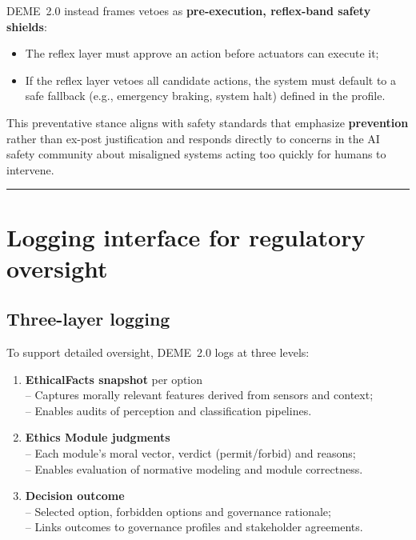 \documentclass[11pt]{article}
\begin{document}
DEME~2.0 instead frames vetoes as \textbf{pre-execution, reflex-band safety shields}:

\begin{itemize}
  \item The reflex layer must approve an action before actuators can execute it;
  \item If the reflex layer vetoes all candidate actions, the system must default to a safe fallback (e.g., emergency braking, system halt) defined in the profile.
\end{itemize}

This preventative stance aligns with safety standards that emphasize \textbf{prevention} rather than ex-post justification and responds directly to concerns in the AI safety community about misaligned systems acting too quickly for humans to intervene.

\hrule
\vspace{1em}

\section{Logging interface for regulatory oversight}

\subsection{Three-layer logging}

To support detailed oversight, DEME~2.0 logs at three levels:

\begin{enumerate}
  \item \textbf{EthicalFacts snapshot} per option\\
  -- Captures morally relevant features derived from sensors and context;\\
  -- Enables audits of perception and classification pipelines.

  \item \textbf{Ethics Module judgments}\\
  -- Each module's moral vector, verdict (permit/forbid) and reasons;\\
  -- Enables evaluation of normative modeling and module correctness.

  \item \textbf{Decision outcome}\\
  -- Selected option, forbidden options and governance rationale;\\
  -- Links outcomes to governance profiles and stakeholder agreements.
\end{enumerate}
\end{document}
